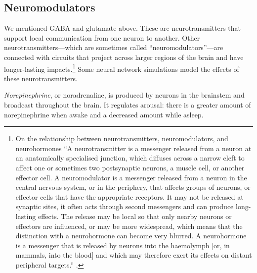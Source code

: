 \subsection{Neuromodulators}\label{neuroModulator}


We mentioned GABA and glutamate above. These are neurotransmitters that support local communication from one neuron to another. Other neurotransmitters---which are sometimes called ``neuromodulators''---are connected with circuits that project across larger regions of the brain and have longer-lasting impacts.\footnote{On the relationship between neurotransmitters, neuromodulators, and neurohormones  ``A neurotransmitter is a messenger released from a neuron at an anatomically specialised junction, which diffuses across a narrow cleft to affect one or sometimes two postsynaptic neurons, a muscle cell, or another effector cell. A neuromodulator is a messenger released from a neuron in the central nervous system, or in the periphery, that affects groups of neurons, or effector cells that have the appropriate receptors. It may not be released at synaptic sites, it often acts through second messengers and can produce long-lasting effects. The release may be local so that only nearby neurons or effectors are influenced, or may be more widespread, which means that the distinction with a neurohormone can become very blurred. A neurohormone is a messenger that is released by neurons into the haemolymph [or, in mammals, into the blood] and which may therefore exert its effects on distant peripheral targets.'' \cite{burrows1996neurobiology}.}   Some neural network simulations model the effects of these neurotransmitters.

\emph{Norepinephrine}, or noradrenaline, is produced by neurons in the brainstem and broadcast throughout the brain. It regulates arousal: there is a greater amount of norepinephrine when awake and a decreased amount while asleep. 

